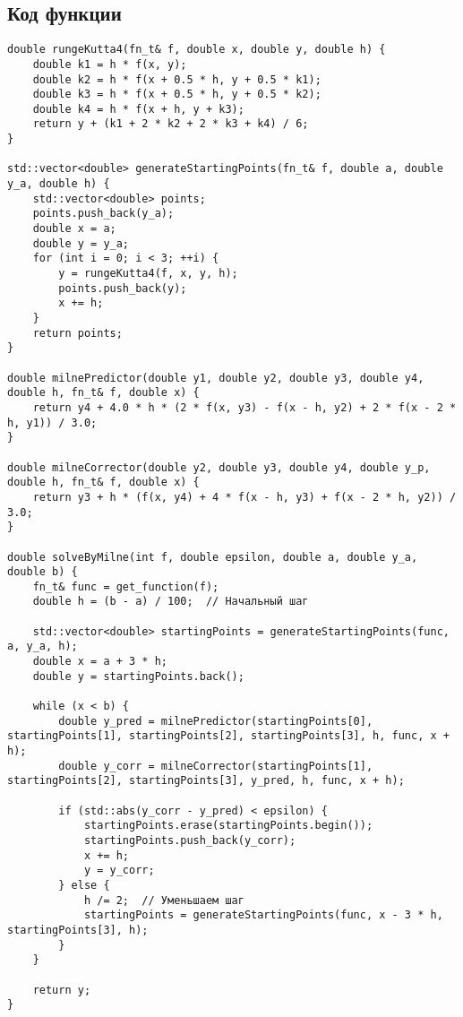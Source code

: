 \subsection{Код функции}
\begin{lstlisting}
double rungeKutta4(fn_t& f, double x, double y, double h) {
    double k1 = h * f(x, y);
    double k2 = h * f(x + 0.5 * h, y + 0.5 * k1);
    double k3 = h * f(x + 0.5 * h, y + 0.5 * k2);
    double k4 = h * f(x + h, y + k3);
    return y + (k1 + 2 * k2 + 2 * k3 + k4) / 6;
}

std::vector<double> generateStartingPoints(fn_t& f, double a, double y_a, double h) {
    std::vector<double> points;
    points.push_back(y_a);
    double x = a;
    double y = y_a;
    for (int i = 0; i < 3; ++i) {
        y = rungeKutta4(f, x, y, h);
        points.push_back(y);
        x += h;
    }
    return points;
}

double milnePredictor(double y1, double y2, double y3, double y4, double h, fn_t& f, double x) {
    return y4 + 4.0 * h * (2 * f(x, y3) - f(x - h, y2) + 2 * f(x - 2 * h, y1)) / 3.0;
}

double milneCorrector(double y2, double y3, double y4, double y_p, double h, fn_t& f, double x) {
    return y3 + h * (f(x, y4) + 4 * f(x - h, y3) + f(x - 2 * h, y2)) / 3.0;
}

double solveByMilne(int f, double epsilon, double a, double y_a, double b) {
    fn_t& func = get_function(f);
    double h = (b - a) / 100;  // Начальный шаг
    
    std::vector<double> startingPoints = generateStartingPoints(func, a, y_a, h);
    double x = a + 3 * h;
    double y = startingPoints.back();
    
    while (x < b) {
        double y_pred = milnePredictor(startingPoints[0], startingPoints[1], startingPoints[2], startingPoints[3], h, func, x + h);
        double y_corr = milneCorrector(startingPoints[1], startingPoints[2], startingPoints[3], y_pred, h, func, x + h);
        
        if (std::abs(y_corr - y_pred) < epsilon) {
            startingPoints.erase(startingPoints.begin());
            startingPoints.push_back(y_corr);
            x += h;
            y = y_corr;
        } else {
            h /= 2;  // Уменьшаем шаг
            startingPoints = generateStartingPoints(func, x - 3 * h, startingPoints[3], h);
        }
    }
    
    return y;
}
\end{lstlisting}
